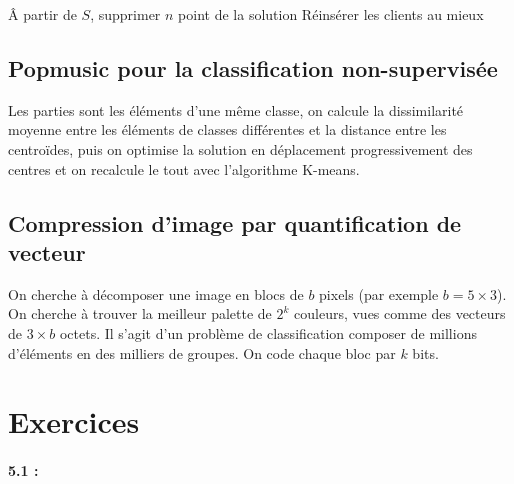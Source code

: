 \documentclass[11pt,a4paper]{report}
\begin{document}
\begin{algorithm}[H]
\end{algorithm}

\begin{algorithm}[H]
Â partir de $S$, supprimer $n$ point de la solution\;
Réinsérer les clients au mieux\; 
\end{algorithm}

\subsection{Popmusic pour la classification non-supervisée}

Les parties sont les éléments d'une même classe, on calcule la dissimilarité moyenne entre les éléments de classes différentes et la distance entre les centroïdes, puis on optimise la solution en déplacement progressivement des centres et on recalcule le tout avec l'algorithme K-means.

\subsection{Compression d'image par quantification de vecteur}

On cherche à décomposer une image en blocs de $b$ pixels (par exemple $b=5 \times 3$). On cherche à trouver la meilleur palette de $2^k$ couleurs, vues comme des vecteurs de $3 \times b$ octets. Il s'agit d'un problème de classification composer de millions d'éléments en des milliers de groupes. On code chaque bloc par $k$ bits.

\section{Exercices}

\paragraph*{5.1 : } 
\end{document}
